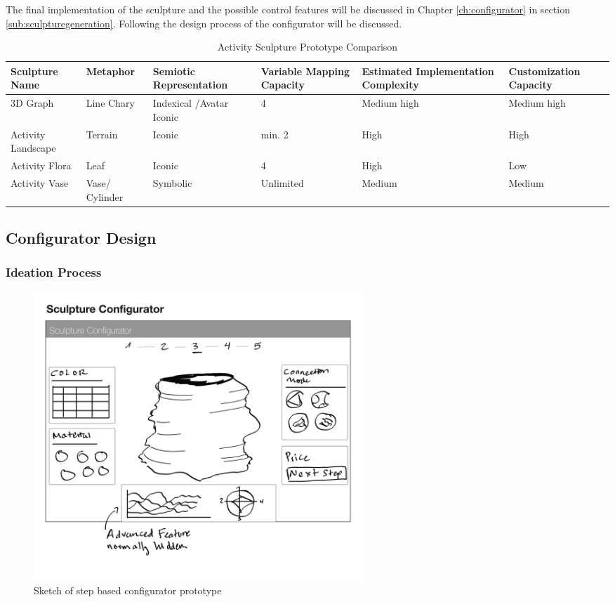 \documentclass[../medieninformatik-arbeit.tex]{subfiles}
\begin{document}
The final implementation of the sculpture and the possible control features will be discussed in Chapter \ref{ch:configurator} in section \ref{sub:sculpturegeneration}. Following the design process of the configurator will be discussed.   

\begin{table}[h]
\centering
\begin{tabular}{*{6}{|p{2.1cm}}|}
 \hline
 Sculpture Name & Metaphor & Semiotic Representation & Variable Mapping Capacity & Estimated Implementation Complexity & Customization Capacity \\
 \hline
 3D Graph & Line Chary & Indexical 	/Avatar Iconic & 4 & Medium high & Medium high\\
 \hline
 Activity Landscape & Terrain & Iconic & min. 2 & High & High\\
 \hline
 Activity Flora & Leaf & Iconic & 4 & High & Low\\
 \hline
 Activity Vase & Vase/	Cylinder & Symbolic & Unlimited & Medium & Medium\\
 \hline
\end{tabular}
\caption{Activity Sculpture Prototype Comparison}
\label{tab:comparison}
\end{table}

\subsection{Configurator Design}
\cite{abbasi2012s}
\cite{Konstanzer20078609220}
\cite{rolland2012commerce}

\subsubsection{Ideation Process}


\begin{figure}[h]
\captionsetup{width=0.9\textwidth}
\begin{center}
  \includegraphics[width=0.6\textwidth]{Prototype/img/ui_proto1}
  \caption{Sketch of step based configurator prototype}
\label{fig:uiproto1}
\end{center}
\end{figure}
\end{document}
